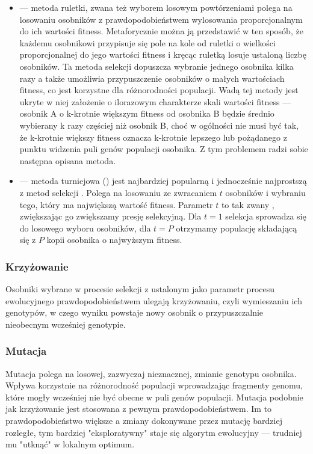 \begin{itemize}

\item {} --- metoda ruletki, zwana też wyborem losowym powtórzeniami  polega na losowaniu osobników z prawdopodobieństwem wylosowania proporcjonalnym do ich wartości fitness. Metaforycznie można ją przedstawić w ten sposób, że każdemu osobnikowi przypisuje się pole na kole od ruletki o wielkości proporcjonalnej do jego wartości fitness i kręcąc ruletką losuje ustaloną liczbę osobników. 
Ta metoda selekcji dopuszcza wybranie jednego osobnika kilka razy a także umożliwia przypuszczenie osobników o małych wartościach fitness, co jest korzystne dla różnorodności populacji. Wadą tej metody jest ukryte w niej założenie o ilorazowym charakterze skali wartości fitness --- osobnik A o k-krotnie większym fitness od osobnika B będzie średnio wybierany k razy częściej niż osobnik B, choć w ogólności nie musi być tak, że k-krotnie większy fitness oznacza k-krotnie lepszego lub pożądanego z punktu widzenia puli genów populacji osobnika. Z tym problemem radzi sobie następna opisana metoda.

\item {} --- metoda turniejowa () jest najbardziej popularną i jednocześnie najprostszą z metod selekcji \cite{Luke2009Metaheuristics}. Polega na losowaniu ze zwracaniem $ t $ osobników i wybraniu tego, który ma największą wartość fitness. Parametr $ t $ to tak zwany , zwiększając go zwiększamy presję selekcyjną. Dla $ t = 1 $ selekcja sprowadza się do losowego wyboru osobników, dla $ t = P $ otrzymamy populację składającą się z $ P $ kopii osobnika o najwyższym fitness.	

\end{itemize}


\subsubsection{Krzyżowanie}
Osobniki wybrane w procesie selekcji z ustalonym jako parametr procesu ewolucyjnego prawdopodobieństwem ulegają krzyżowaniu, czyli wymieszaniu ich genotypów, w czego wyniku powstaje nowy osobnik o przypuszczalnie nieobecnym wcześniej genotypie.

\subsubsection{Mutacja}
Mutacja polega na losowej, zazwyczaj nieznacznej, zmianie genotypu osobnika. Wpływa korzystnie na różnorodność populacji wprowadzając fragmenty genomu, które mogły wcześniej nie być obecne w puli genów populacji. Mutacja podobnie jak krzyżowanie jest stosowana z pewnym prawdopodobieństwem. Im to prawdopodobieństwo większe a zmiany dokonywane przez mutację bardziej rozległe, tym bardziej "eksploratywny" staje się algorytm ewolucyjny --- trudniej mu "utknąć" w lokalnym optimum.

